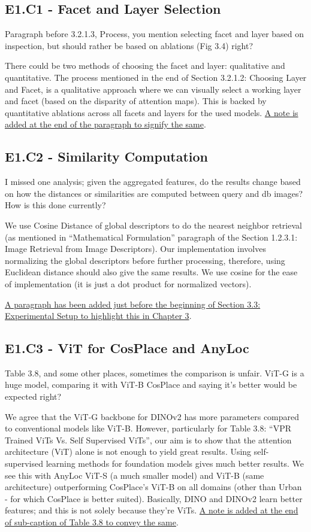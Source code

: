 \newcommand{\ec}[2]{
    \subsection{#1}
    \begin{tcolorbox}[title=#1]
        #2
    \end{tcolorbox}
}


\ec{E1.C1 - Facet and Layer Selection}{
    Paragraph before 3.2.1.3, Process, you mention selecting facet and
    layer based on inspection, but should rather be based on ablations
    (Fig 3.4) right?
}

There could be two methods of choosing the facet and layer:
qualitative and quantitative. The process mentioned in the end of
Section 3.2.1.2: Choosing Layer and Facet, is a qualitative approach
where we can visually select a working layer and facet (based on the
disparity of attention maps). This is backed by quantitative ablations
across all facets and layers for the used models. \ul{A note is added
at the end of the paragraph to signify the same}.

\ec{E1.C2 - Similarity Computation}{
    I missed one analysis; given the aggregated features, do the
    results change based on how the distances or similarities are
    computed between query and db images? How is this done currently?
}

We use Cosine Distance of global descriptors to do the nearest
neighbor retrieval (as mentioned in ``Mathematical Formulation''
paragraph of the Section 1.2.3.1: Image Retrieval from Image
Descriptors). Our implementation involves normalizing the global
descriptors before further processing, therefore, using Euclidean
distance should also give the same results. We use cosine for the ease
of implementation (it is just a dot product for normalized vectors).

\ul{A paragraph has been added just before the beginning of
Section 3.3: Experimental Setup to highlight this in Chapter 3}.

\ec{E1.C3 - ViT for CosPlace and AnyLoc}{
    Table 3.8, and some other places, sometimes the comparison is
    unfair. ViT-G is a huge model, comparing it with ViT-B CosPlace
    and saying it's better would be expected right?
}

We agree that the ViT-G backbone for DINOv2 has more parameters
compared to conventional models like ViT-B. However, particularly for
Table 3.8: ``VPR Trained ViTs Vs. Self Supervised ViTs'', our aim is
to show that the attention architecture (ViT) alone is not enough to
yield great results. Using self-supervised learning methods for
foundation models gives much better results. We see this with AnyLoc
ViT-S (a much smaller model) and ViT-B (same architecture)
outperforming CosPlace's ViT-B on all domains (other than Urban - for
which CosPlace is better suited). Basically, DINO and DINOv2 learn
better features; and this is not solely because they're ViTs. \ul{A
note is added at the end of sub-caption of Table 3.8 to convey the
same}.


